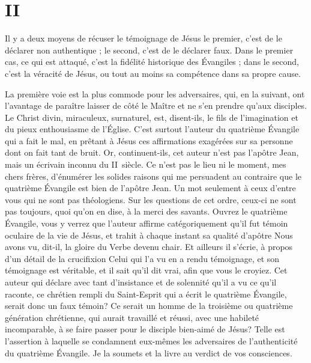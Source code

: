 \section{II}

Il y a deux moyens de récuser le témoignage de Jésus\frcolon{} le premier, c’est de le déclarer non authentique ; le second, c’est de le déclarer faux. Dans le premier cas, ce qui est attaqué, c’est la fidélité historique des Évangiles ; dans le second, c’est la véracité de Jésus, ou tout au moins sa compétence dans sa propre cause.

La première voie est la plus commode pour les adversaires, qui, en la suivant, ont l’avantage de paraître laisser de côté le Maître et ne s’en prendre qu’aux disciples.
Le Christ divin, miraculeux, surnaturel, est, disent-ils, le fils de l’imagination et du pieux enthousiasme de l’Église.
C’est surtout l’auteur du quatrième Évangile qui a fait le mal, en prêtant à Jésus ces affirmations exagérées sur sa personne dont on fait tant de bruit.
Or, continuent-ils, cet auteur n’est pas l’apôtre Jean, mais un écrivain inconnu du II~siècle. \ocadr{} Ce n’est pas le lieu ni le moment, mes chers frères, d’énumérer les solides raisons qui me persuadent au contraire que le quatrième Évangile est bien de l’apôtre Jean.
Un mot seulement à ceux d’entre vous qui ne sont pas théologiens. Sur les questions de cet ordre, ceux-ci ne sont pas toujours, quoi qu’on en dise, à la merci des savants. Ouvrez le quatrième Évangile, vous y verrez que l’auteur affirme catégoriquement qu’il fut témoin oculaire de la vie de Jésus, et trahit à chaque instant sa qualité d’apôtre\frcolon{}
\Og{} Nous avons vu, dit-il, la gloire du Verbe devenu chair.\Fg{}
Et ailleurs il s’écrie, à propos d’un détail de la crucifixion\frcolon{}
\Og{} Celui qui l’a vu en a rendu témoignage, et son témoignage est véritable, et il sait qu’il dit vrai, afin que vous le croyiez.\Fg{}
Cet auteur qui déclare avec tant d’insistance et de solennité qu’il a vu ce qu’il raconte, ce chrétien rempli du Saint-Esprit qui a écrit le quatrième Évangile, serait donc un faux témoin?
Ce serait un homme de la troisième ou quatrième génération chrétienne, qui aurait travaillé et réussi, avec une habileté incomparable,
à se faire passer pour le disciple bien-aimé de Jésus? \ocadr{} Telle est l’assertion à laquelle se condamnent eux-mêmes les adversaires
de l’authenticité du quatrième Évangile.
Je la soumets et la livre au verdict de vos consciences.

